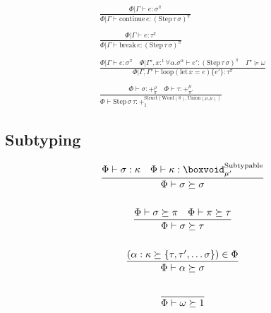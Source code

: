\documentclass {article}
\begin{document}
\begin{gather*}
\frac
{\Phi | \Gamma \vdash e : \sigma^\pi }
{\Phi | \Gamma \vdash \text{continue} \, e : (\text{Step} \, \tau \, \sigma)^\pi } \\
\\
\frac
{\Phi | \Gamma \vdash e : \tau^\pi }
{\Phi | \Gamma \vdash \text{break} \, e : (\text{Step} \, \tau \, \sigma)^\pi } \\
\\
\frac
{\Phi | \Gamma \vdash e : \sigma^\pi \quad \Phi | \Gamma', x :^1 \forall \alpha. \sigma^\alpha \vdash e' : (\text{Step} \, \tau \, \sigma) ^\pi \quad \Gamma' \succeq \omega }
{\Phi | \Gamma, \Gamma' \vdash \text{loop} (\text{let} \, x = e) \{ e' \} : \tau^\pi } \\
\\
\frac
{\Phi \vdash \sigma : +^{\rho}_{\pi} \quad \Phi \vdash \tau : +^{\mu}_{\pi'} }
{\Phi \vdash \text{Step} \, \sigma \, \tau : +^{\text{Struct} (\text{Word} (8), \text{Union} (\rho, \mu) ) }_1 }
\end{gather*}

\subsection{Subtyping}
\begin{gather*}
\frac
{\Phi \vdash \sigma : \kappa \quad \Phi \vdash \kappa : \boxvoid^\text{Subtypable}_{\mu'}}
{\Phi \vdash \sigma \succeq \sigma} \\
\\
\frac
{\Phi \vdash \sigma \succeq \pi \quad \Phi \vdash \pi \succeq \tau}
{\Phi \vdash \sigma \succeq \tau} \\
\\
\frac
{(\alpha : \kappa \succeq  \{ \tau, \tau', \dots \sigma \}) \in \Phi }
{\Phi \vdash \alpha \succeq \sigma} \\
\\
\frac
{}
{\Phi \vdash \omega \succeq 1}
\end{gather*}
\end{document}

